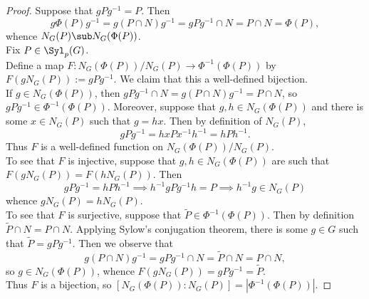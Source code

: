 \documentclass[12pt]{article}
\begin{document}
\begin{homeworkProblem}
  \begin{proof}

    Suppose that $ g P g^{-1} = P $. Then $$ g \Phi(P) g^{-1} = g(P\cap N)g^{-1} = gPg^{-1}\cap N = P\cap N = \Phi(P), $$ whence $ N_{G}(P)\sub N_{G}( \Phi(P)) $.\\


    Fix $ P\in \Syl_{p}(G) $. \\
    Define a map $ F:N_{G}( \Phi(P))/N_{G}(P) \to \Phi^{-1}( \Phi(P)) $ by $ F(gN_{G}(P)):=gPg^{-1} $. We claim that this a well-defined bijection.\\

    If $ g\in N_{G}(\Phi(P)) $, then $ gPg^{-1}\cap N = g(P\cap N)g^{-1} = P\cap N $, so $ gPg^{-1}\in \Phi^{-1}(\Phi(P)) $. Moreover, suppose that $ g,h\in N_{G}(\Phi(P)) $ and there is some $ x\in N_{G}(P) $ such that $ g= hx $. Then by definition of $ N_{G}(P) $,
    \[
      gPg^{-1} = hx P x^{-1}h^{-1} = hPh^{-1}.
    \]
    Thus $ F $ is a well-defined function on $ N_{G}(\Phi(P))/N_{G}(P) $.\\

    To see that $ F $ is injective, suppose that $ g,h\in N_{G}(\Phi(P)) $ are such that $ F(gN_{G}(P)) = F(hN_{G}(P)) $. Then $$ gPg^{-1}= hPh^{-1} \implies h^{-1}gP g^{-1}h = P \implies h^{-1}g \in N_{G}(P) $$
    whence $ gN_{G}(P) = hN_{G}(P) $.\\

    To see that $ F $ is surjective, suppose that $ \widetilde{P}\in \Phi^{-1}(\Phi(P)) $. Then by definition $ \widetilde{P}\cap N = P\cap N $. Applying Sylow's conjugation theorem, there is some $ g\in G $ such that $ \widetilde{P} = gPg^{-1} $. Then we observe that 
    \[
      g(P\cap N)g^{-1} = gPg^{-1} \cap N = \widetilde{P}\cap N = P\cap N,
    \]
    so $ g\in N_{G}(\Phi(P)) $, whence $ F(gN_{G}(P)) = gPg^{-1} = \widetilde{P} $. \\

    Thus $ F $ is a bijection, so $ [N_{G}(\Phi(P)) : N_{G}(P)] = | \Phi^{-1}(\Phi(P))| $. 
  \end{proof}


\end{homeworkProblem}
\end{document}
